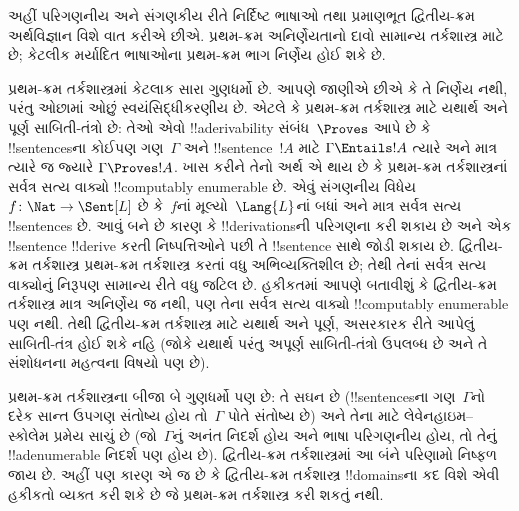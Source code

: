 \documentclass[../../../include/open-logic-section]{subfiles}
\begin{document}


અહીં પરિગણનીય અને સંગણકીય રીતે નિર્દિષ્ટ ભાષાઓ તથા પ્રમાણભૂત
દ્વિતીય-ક્રમ અર્થવિજ્ઞાન વિશે વાત કરીએ છીએ. પ્રથમ-ક્રમ
અનિર્ણેયતાનો દાવો સામાન્ય તર્કશાસ્ત્ર માટે છે; કેટલીક મર્યાદિત
ભાષાઓના પ્રથમ-ક્રમ ભાગ નિર્ણેય હોઈ શકે છે.

પ્રથમ-ક્રમ તર્કશાસ્ત્રમાં કેટલાક સારા ગુણધર્મો છે. આપણે જાણીએ છીએ કે
તે નિર્ણેય નથી, પરંતુ ઓછામાં ઓછું સ્વયંસિદ્ધીકરણીય છે. એટલે કે
પ્રથમ-ક્રમ તર્કશાસ્ત્ર માટે યથાર્થ અને પૂર્ણ સાબિતી-તંત્રો છે: તેઓ
એવો !!a{derivability} સંબંધ~$\Proves$ આપે છે કે !!{sentence}sના કોઈપણ
ગણ~$\Gamma$ અને !!{sentence}~$!A$ માટે $\Gamma \Entails !A$ ત્યારે અને માત્ર
ત્યારે જ જ્યારે $\Gamma \Proves !A$. ખાસ કરીને તેનો અર્થ એ થાય છે કે
પ્રથમ-ક્રમ તર્કશાસ્ત્રનાં સર્વત્ર સત્ય વાક્યો !!{computably
  enumerable} છે. એવું સંગણનીય વિધેય~$f\colon \Nat \to
\Sent[L]$ છે કે~$f$નાં મૂલ્યો~$\Lang{L}$નાં બધાં અને માત્ર સર્વત્ર સત્ય
!!{sentence}s છે. આવું બને છે કારણ કે !!{derivation}sની પરિગણના
કરી શકાય છે અને એક !!{sentence} !!{derive} કરતી નિષ્પત્તિઓને પછી
તે !!{sentence} સાથે જોડી શકાય છે. દ્વિતીય-ક્રમ તર્કશાસ્ત્ર
પ્રથમ-ક્રમ તર્કશાસ્ત્ર કરતાં વધુ અભિવ્યક્તિશીલ છે; તેથી તેનાં
સર્વત્ર સત્ય વાક્યોનું નિરૂપણ સામાન્ય રીતે વધુ જટિલ છે. હકીકતમાં આપણે
બતાવીશું કે દ્વિતીય-ક્રમ તર્કશાસ્ત્ર માત્ર અનિર્ણેય જ નથી, પણ તેના
સર્વત્ર સત્ય વાક્યો !!{computably
  enumerable} પણ નથી. તેથી દ્વિતીય-ક્રમ તર્કશાસ્ત્ર માટે યથાર્થ અને
પૂર્ણ, અસરકારક રીતે આપેલું સાબિતી-તંત્ર હોઈ શકે નહિ
(જોકે યથાર્થ પરંતુ અપૂર્ણ સાબિતી-તંત્રો
ઉપલબ્ધ છે અને તે સંશોધનના મહત્વના વિષયો પણ છે).

પ્રથમ-ક્રમ તર્કશાસ્ત્રના બીજા બે ગુણધર્મો પણ છે: તે સઘન છે (!!{sentence}sના
ગણ~$\Gamma$નો દરેક સાન્ત ઉપગણ સંતોષ્ય હોય તો~$\Gamma$ પોતે સંતોષ્ય
છે) અને તેના માટે લેવેનહાઇમ--સ્કોલેમ પ્રમેય સાચું છે (જો~$\Gamma$નું
અનંત નિદર્શ હોય અને ભાષા પરિગણનીય હોય, તો તેનું
!!a{denumerable} નિદર્શ પણ હોય છે).
દ્વિતીય-ક્રમ તર્કશાસ્ત્રમાં આ બંને પરિણામો નિષ્ફળ જાય છે. અહીં પણ
કારણ એ જ છે કે દ્વિતીય-ક્રમ તર્કશાસ્ત્ર !!{domain}sના કદ વિશે એવી
હકીકતો વ્યક્ત કરી શકે છે જે પ્રથમ-ક્રમ તર્કશાસ્ત્ર કરી શકતું નથી.
\end{document}
